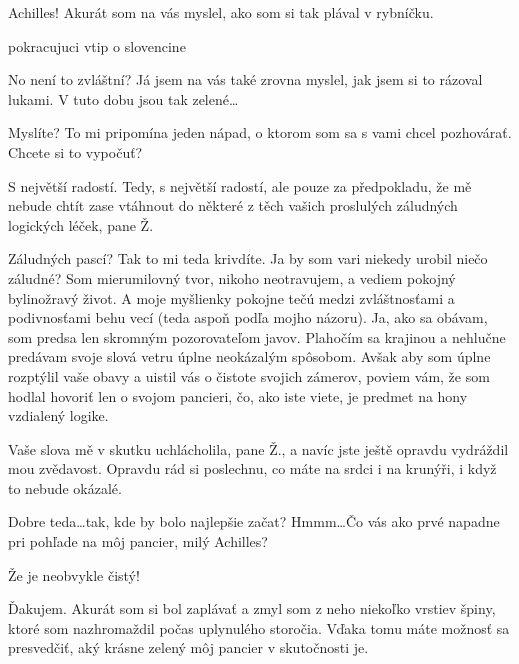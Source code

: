 \documentclass[12pt]{article}
\begin{document}
\begin{description}[itemsep=0pt]

\item[Ž:] Achilles! Akurát som na vás myslel, ako som si tak plával v rybníčku.

\item[TODO] pokracujuci vtip o slovencine

\item[A:] No není to zvláštní? Já jsem na vás také zrovna myslel, jak jsem si
    to rázoval lukami. V tuto dobu jsou tak zelené…

\item[Ž:] Myslíte? To mi pripomína jeden nápad, o ktorom som sa s vami chcel pozhovárať. Chcete si to vypočuť?

\item[A:] S největší radostí. Tedy, s největší radostí, ale pouze za předpokladu,
    že mě nebude chtít zase vtáhnout do některé z těch vašich proslulých
    záludných logických léček, pane Ž.

\item[Ž:] Záludných pascí? Tak to mi teda krivdíte. Ja by som vari niekedy urobil niečo záludné? Som mierumilovný tvor, nikoho neotravujem, a vediem pokojný bylinožravý život. A moje myšlienky pokojne tečú medzi zvláštnosťami a podivnosťami behu vecí (teda aspoň podľa mojho názoru). Ja, ako sa obávam, som predsa len skromným pozorovateľom javov. Plahočím sa krajinou a nehlučne predávam svoje slová vetru úplne neokázalým spôsobom. Avšak aby som úplne rozptýlil vaše obavy a uistil vás o čistote svojich zámerov, poviem vám, že som hodlal hovoriť len o svojom pancieri, čo, ako iste viete, je predmet na hony vzdialený logike.

\item[A:] Vaše slova mě v skutku uchlácholila, pane Ž., a navíc jste ještě opravdu
    vydráždil mou zvědavost. Opravdu rád si poslechnu, co máte na srdci i na krunýři,
    i když to nebude okázalé.

\item[Ž:] Dobre teda\dots tak, kde by bolo najlepšie začat? Hmmm\dots Čo vás ako prvé napadne pri pohľade na môj pancier, milý Achilles?

\item[A:] Že je neobvykle čistý!

\item[Ž:] Ďakujem. Akurát som si bol zaplávať a zmyl som z neho niekoľko vrstiev špiny, ktoré som nazhromaždil počas uplynulého storočia. Vďaka tomu máte možnosť sa presvedčiť, aký krásne zelený môj pancier v skutočnosti je.


\end{description}
\end{document}
